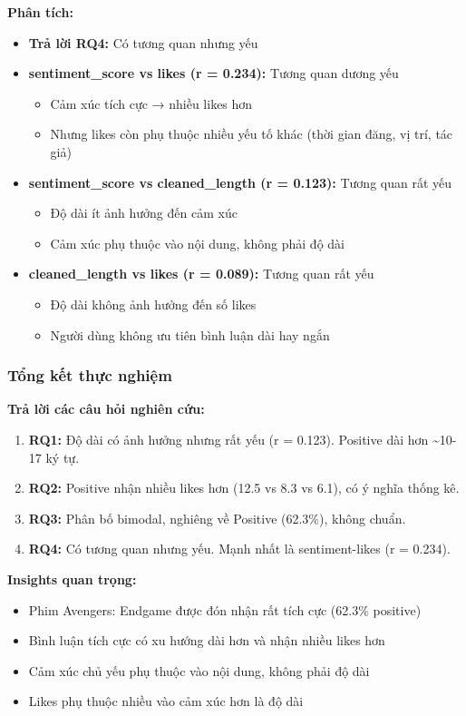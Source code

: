 \textbf{Phân tích:}
\begin{itemize}
    \item \textbf{Trả lời RQ4:} Có tương quan nhưng yếu
    \item \textbf{sentiment\_score vs likes (r = 0.234):} Tương quan dương yếu
    \begin{itemize}
        \item Cảm xúc tích cực → nhiều likes hơn
        \item Nhưng likes còn phụ thuộc nhiều yếu tố khác (thời gian đăng, vị trí, tác giả)
    \end{itemize}
    \item \textbf{sentiment\_score vs cleaned\_length (r = 0.123):} Tương quan rất yếu
    \begin{itemize}
        \item Độ dài ít ảnh hưởng đến cảm xúc
        \item Cảm xúc phụ thuộc vào nội dung, không phải độ dài
    \end{itemize}
    \item \textbf{cleaned\_length vs likes (r = 0.089):} Tương quan rất yếu
    \begin{itemize}
        \item Độ dài không ảnh hưởng đến số likes
        \item Người dùng không ưu tiên bình luận dài hay ngắn
    \end{itemize}
\end{itemize}

\subsubsection{Tổng kết thực nghiệm}

\textbf{Trả lời các câu hỏi nghiên cứu:}
\begin{enumerate}
    \item \textbf{RQ1:} Độ dài có ảnh hưởng nhưng rất yếu (r = 0.123). Positive dài hơn \textasciitilde 10-17 ký tự.
    \item \textbf{RQ2:} Positive nhận nhiều likes hơn (12.5 vs 8.3 vs 6.1), có ý nghĩa thống kê.
    \item \textbf{RQ3:} Phân bố bimodal, nghiêng về Positive (62.3\%), không chuẩn.
    \item \textbf{RQ4:} Có tương quan nhưng yếu. Mạnh nhất là sentiment-likes (r = 0.234).
\end{enumerate}

\textbf{Insights quan trọng:}
\begin{itemize}
    \item Phim Avengers: Endgame được đón nhận rất tích cực (62.3\% positive)
    \item Bình luận tích cực có xu hướng dài hơn và nhận nhiều likes hơn
    \item Cảm xúc chủ yếu phụ thuộc vào nội dung, không phải độ dài
    \item Likes phụ thuộc nhiều vào cảm xúc hơn là độ dài
\end{itemize}

